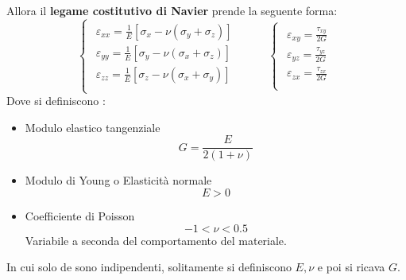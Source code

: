 \documentclass{article}
\begin{document}
\begin{adjustwidth}{2in}{}
	Allora il \textbf{legame costitutivo di Navier} prende la seguente forma:	
		\[
	\begin{cases}
		\begin{aligned}
			\varepsilon_{xx} =  \frac{1}{E}\left[ \sigma_x - \nu(\sigma_y + \sigma_z) \right] \\
			\varepsilon_{yy} =  \frac{1}{E}\left[ \sigma_y - \nu(\sigma_x + \sigma_z) \right] \\
			\varepsilon_{zz} =  \frac{1}{E}\left[ \sigma_z - \nu(\sigma_x + \sigma_y) \right] \\
		\end{aligned}
	\end{cases} \hspace{1cm} \begin{cases}
		\begin{aligned}
			\varepsilon_{xy} =  \frac{\tau_{xy}}{2G} \\
			\varepsilon_{yz} =  \frac{\tau_{yz}}{2G} \\
			\varepsilon_{zx} =  \frac{\tau_{zx}}{2G}  \\
		\end{aligned}
	\end{cases}
	\]
	Dove si definiscono : 
	\begin{itemize}
	\item Modulo elastico tangenziale 
	\[ G = \frac{E}{2(1+ \nu)} \]
	
	\item Modulo di Young o Elasticità normale
	 \[E > 0\]

 	\item Coefficiente di Poisson 
 	\[-1<\nu<0.5\]
 	Variabile a seconda del comportamento del materiale.
	\end{itemize}
	In cui solo de sono indipendenti, solitamente si definiscono $E, \nu$ e poi si ricava $G$. \newline 
	

\end{adjustwidth}
\end{document}
